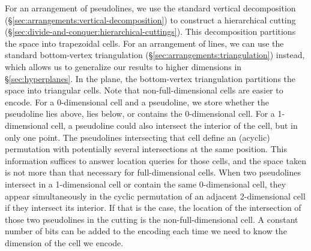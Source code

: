 %
For an arrangement of pseudolines, we use the standard vertical decomposition
(\S\ref{sec:arrangements:vertical-decomposition})
to construct a hierarchical cutting
(\S\ref{sec:divide-and-conquer:hierarchical-cuttings}).
%
This decomposition partitions the space into trapezoidal cells.
%
For an arrangement of lines, we can
use the standard bottom-vertex triangulation
(\S\ref{sec:arrangements:triangulation})
instead, which allows us to
generalize our results to higher dimensions in \S\ref{sec:hyperplanes}.
%
In the plane, the bottom-vertex triangulation partitions the space into
triangular cells.
%
Note that non-full-dimensional cells are easier to encode. For a 0-dimensional
cell and a pseudoline, we store whether the pseudoline lies above, lies below,
or contains the 0-dimensional cell. For a 1-dimensional cell, a pseudoline
could also intersect the interior of the cell, but in only one point. The
pseudolines intersecting that cell define an (acyclic) permutation with potentially
several intersections at the same position. This information suffices to answer
location queries for those cells, and the space taken is not more than that
necessary for full-dimensional cells. When two pseudolines intersect in a
1-dimensional cell or contain the same 0-dimensional cell, they
appear simultaneously in the cyclic permutation of an adjacent 2-dimensional
cell if they intersect its interior. If that is the case, the location of
the intersection of those two pseudolines in the cutting is the
non-full-dimensional cell. A constant number of bits can be added to the
encoding each time we need to know the dimension of the cell we encode.
